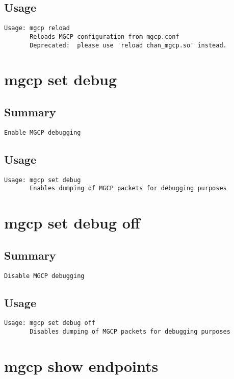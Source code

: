 \subsection{Usage}
\begin{verbatim}
Usage: mgcp reload
       Reloads MGCP configuration from mgcp.conf
       Deprecated:  please use 'reload chan_mgcp.so' instead.

\end{verbatim}


\section{mgcp set debug}
\subsection{Summary}
\begin{verbatim}
Enable MGCP debugging
\end{verbatim}
\subsection{Usage}
\begin{verbatim}
Usage: mgcp set debug
       Enables dumping of MGCP packets for debugging purposes

\end{verbatim}


\section{mgcp set debug off}
\subsection{Summary}
\begin{verbatim}
Disable MGCP debugging
\end{verbatim}
\subsection{Usage}
\begin{verbatim}
Usage: mgcp set debug off
       Disables dumping of MGCP packets for debugging purposes

\end{verbatim}


\section{mgcp show endpoints}

